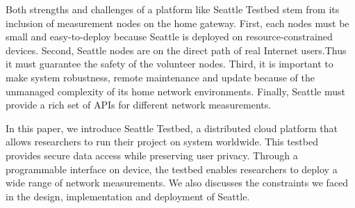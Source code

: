 Both strengths and challenges of a platform like Seattle Testbed stem from its inclusion of measurement nodes on the home gateway. First, each nodes must be small and easy-to-deploy because Seattle is deployed on resource-constrained devices. Second, Seattle nodes are on the direct path of real Internet users.Thus it must guarantee the safety of the volunteer nodes. Third, it is important to make system robustness, remote maintenance and update because of the unmanaged complexity of its home network environments. Finally, Seattle must provide a rich set of APIs for different network measurements.

In this paper, we introduce Seattle Testbed, a distributed cloud platform that allows researchers to run their project on system worldwide. This testbed provides secure data access while preserving user privacy. Through a programmable interface on device, the testbed enables researchers to deploy a wide range of network measurements. We also discusses the constraints we faced in the design, implementation and deployment of Seattle.
